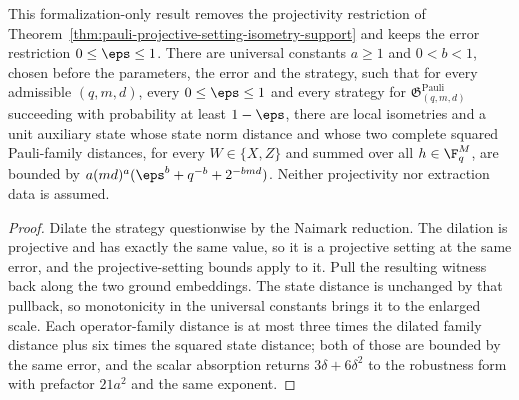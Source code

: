 \begin{theorem}
  \label{thm:pauli-arbitrary-strategy-isometry-support}
  \leanok
  This formalization-only result removes the projectivity restriction of
  Theorem~\ref{thm:pauli-projective-setting-isometry-support} and keeps the
  error restriction $0\leq\eps\leq1$.  There are universal constants $a\geq1$
  and $0<b<1$, chosen before the parameters, the error and the strategy, such
  that for every admissible $(q,m,d)$, every $0\leq\eps\leq1$ and every
  strategy for $\mathfrak{G}^{\mathrm{Pauli}}_{(q,m,d)}$ succeeding with
  probability at least $1-\eps$, there are local isometries and a unit
  auxiliary state whose state norm distance and whose two complete squared
  Pauli-family distances, for every $W\in\{X,Z\}$ and summed over all
  $h\in\F_q^M$, are bounded by $a(md)^a(\eps^b+q^{-b}+2^{-bmd})$.  Neither
  projectivity nor extraction data is assumed.
\end{theorem}
\begin{proof}
  \leanok
  Dilate the strategy questionwise by the Naimark reduction.  The dilation is
  projective and has exactly the same value, so it is a projective setting at
  the same error, and the projective-setting bounds apply to it.  Pull the
  resulting witness back along the two ground embeddings.  The state distance
  is unchanged by that pullback, so monotonicity in the universal constants
  brings it to the enlarged scale.  Each operator-family distance is at most
  three times the dilated family distance plus six times the squared state
  distance; both of those are bounded by the same error, and the scalar
  absorption returns $3\delta+6\delta^2$ to the robustness form with prefactor
  $21a^2$ and the same exponent.
\end{proof}

